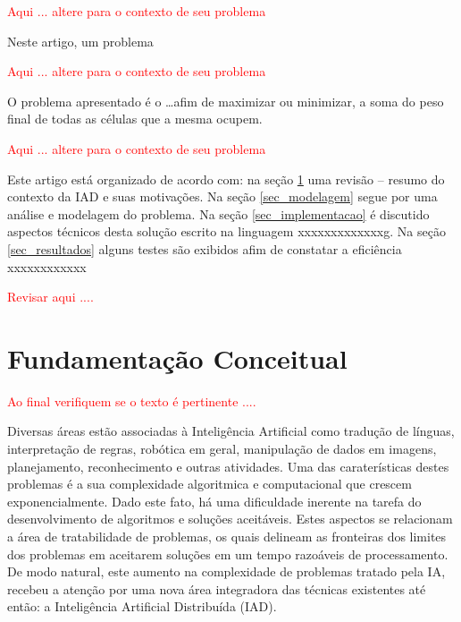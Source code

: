 \documentclass[12pt,final,a4paper]{article}
\theoremstyle{definition}
\begin{document}
{\Large \textcolor{red}{Aqui ... altere para o 
contexto de seu problema}}

Neste artigo, um  problema 



{\Large \textcolor{red}{Aqui ... altere para o 
contexto de seu problema}}

O problema apresentado é o \ldots afim de  maximizar ou minimizar,  a soma do peso final de todas as células que a mesma ocupem.


{\Large \textcolor{red}{Aqui ... altere para o contexto de seu problema}}

Este artigo está organizado de acordo com: na seção \ref{sec_fundamentos}
 uma revisão -- resumo do contexto da IAD e suas
 motivações. Na seção \ref{sec_modelagem} segue por uma análise e modelagem
 do problema. Na seção \ref{sec_implementacao} é discutido aspectos
técnicos desta solução escrito na linguagem xxxxxxxxxxxxxg. Na seção \ref{sec_resultados}
alguns testes são exibidos afim de constatar a eficiência xxxxxxxxxxxx

\textcolor{red}{ Revisar aqui ....}


\section{Fundamentação Conceitual}
\label{sec_fundamentos}




\textcolor{red}{ Ao final verifiquem se o texto é pertinente ....}



Diversas áreas estão associadas à Inteligência Artificial como tradução de línguas, interpretação de regras, robótica em geral,  manipulação de dados em imagens,  planejamento, reconhecimento  e outras atividades. Uma das caraterísticas destes problemas é a sua complexidade algoritmica e computacional que  crescem exponencialmente.
Dado este fato, há uma dificuldade inerente na tarefa do desenvolvimento de algoritmos  e soluções aceitáveis. Estes aspectos se relacionam a área de tratabilidade de problemas,  os quais delineam as fronteiras dos limites dos problemas em aceitarem  soluções em um tempo razoáveis de processamento. De modo natural, este aumento na complexidade de
problemas tratado pela IA, recebeu a atenção por uma nova área integradora das técnicas existentes até então: a Intelig\^encia Artificial Distribuída (IAD).
\end{document}

